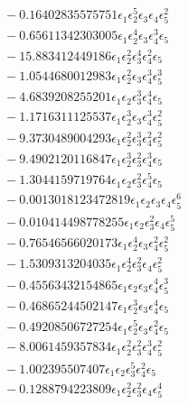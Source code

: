 \documentclass[10pt]{article}
\begin{document}
\begin{align*}
&{}  - 0.16402835575751 \epsilon_{1} \epsilon_{2}^{5} \epsilon_{3} \epsilon_{4} \epsilon_{5}^{2} \\
&{}  - 0.65611342303005 \epsilon_{1} \epsilon_{2}^{4} \epsilon_{3} \epsilon_{4}^{3} \epsilon_{5} \\
&{}  - 15.883412449186 \epsilon_{1} \epsilon_{2}^{2} \epsilon_{3}^{4} \epsilon_{4}^{2} \epsilon_{5} \\
&{}  - 1.0544680012983 \epsilon_{1} \epsilon_{2}^{2} \epsilon_{3} \epsilon_{4}^{3} \epsilon_{5}^{3} \\
&{}  - 4.6839208255201 \epsilon_{1} \epsilon_{2} \epsilon_{3}^{3} \epsilon_{4}^{4} \epsilon_{5} \\
&{}  - 1.1716311125537 \epsilon_{1} \epsilon_{2}^{3} \epsilon_{3} \epsilon_{4}^{3} \epsilon_{5}^{2} \\
&{}  - 9.3730489004293 \epsilon_{1} \epsilon_{2}^{2} \epsilon_{3}^{3} \epsilon_{4}^{2} \epsilon_{5}^{2} \\
&{}  - 9.4902120116847 \epsilon_{1} \epsilon_{2}^{3} \epsilon_{3}^{2} \epsilon_{4}^{3} \epsilon_{5} \\
&{}  - 1.3044159719764 \epsilon_{1} \epsilon_{2} \epsilon_{3}^{2} \epsilon_{4}^{5} \epsilon_{5} \\
&{}  - 0.0013018123472819 \epsilon_{1} \epsilon_{2} \epsilon_{3} \epsilon_{4} \epsilon_{5}^{6} \\
&{}  - 0.010414498778255 \epsilon_{1} \epsilon_{2} \epsilon_{3}^{2} \epsilon_{4} \epsilon_{5}^{5} \\
&{}  - 0.76546566020173 \epsilon_{1} \epsilon_{2}^{4} \epsilon_{3} \epsilon_{4}^{2} \epsilon_{5}^{2} \\
&{}  - 1.5309313204035 \epsilon_{1} \epsilon_{2}^{4} \epsilon_{3}^{2} \epsilon_{4} \epsilon_{5}^{2} \\
&{}  - 0.45563432154865 \epsilon_{1} \epsilon_{2} \epsilon_{3} \epsilon_{4}^{4} \epsilon_{5}^{3} \\
&{}  - 0.46865244502147 \epsilon_{1} \epsilon_{2}^{3} \epsilon_{3} \epsilon_{4}^{4} \epsilon_{5} \\
&{}  - 0.49208506727254 \epsilon_{1} \epsilon_{2}^{5} \epsilon_{3} \epsilon_{4}^{2} \epsilon_{5} \\
&{}  - 8.0061459357834 \epsilon_{1} \epsilon_{2}^{2} \epsilon_{3}^{2} \epsilon_{4}^{3} \epsilon_{5}^{2} \\
&{}  - 1.002395507407 \epsilon_{1} \epsilon_{2} \epsilon_{3}^{5} \epsilon_{4}^{2} \epsilon_{5} \\
&{}  - 0.1288794223809 \epsilon_{1} \epsilon_{2}^{2} \epsilon_{3}^{2} \epsilon_{4} \epsilon_{5}^{4} \\

\end{align*}
\end{document}
